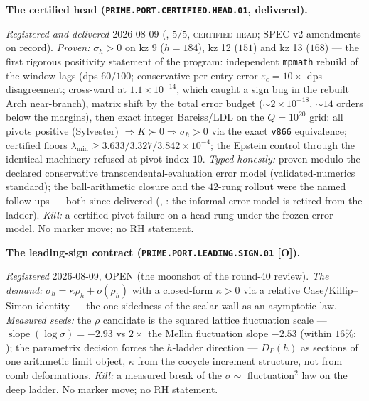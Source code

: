 \par\smallskip\noindent\textbf{The certified head
(\texttt{PRIME.PORT.CERTIFIED.\allowbreak HEAD.01},
delivered).}
{\sloppy
\emph{Registered and delivered} 2026-08-09
(, $5/5$,
\textsc{certified-head}; SPEC v2 amendments on record).
\emph{Proven:} $\sigma_h > 0$ on kz 9 ($h = 184$), kz 12 ($151$)
and kz 13 ($168$) --- the first rigorous positivity statement of
the program: independent \texttt{mpmath} rebuild of the window
lags (dps $60/100$; conservative per-entry error $\varepsilon_c
= 10\times$ dps-disagreement; cross-ward at $1.1\times10^{-14}$,
which caught a sign bug in the rebuilt Arch near-branch), matrix
shift by the total error budget (${\sim}2\times10^{-18}$,
${\sim}14$ orders below the margins), then exact integer
Bareiss/LDL on the $Q = 10^{20}$ grid: all pivots positive
(Sylvester) $\Rightarrow K \succ 0 \Rightarrow \sigma_h > 0$ via
the exact \texttt{v866} equivalence; certified floors
$\lambda_{\min} \ge 3.633/3.327/3.842\times10^{-4}$; the Epstein
control through the identical machinery refused at pivot index
$10$.  \emph{Typed honestly:} proven modulo the declared
conservative transcendental-evaluation error model
(validated-numerics standard); the ball-arithmetic closure and
the $42$-rung rollout were the named follow-ups --- both since
delivered (,
: the informal error
model is retired from the ladder).  \emph{Kill:} a certified
pivot failure on a head rung under the frozen error
model.  No marker move; no RH statement.\par}


\par\smallskip\noindent\textbf{The leading-sign contract
(\texttt{PRIME.PORT.LEADING.\allowbreak SIGN.01} [O]).}
{\sloppy
\emph{Registered} 2026-08-09, OPEN (the moonshot of the
round-40 review).  \emph{The demand:} $\sigma_h = \kappa\rho_h +
o(\rho_h)$ with a closed-form $\kappa > 0$ via a relative
Case/Killip--Simon identity --- the one-sidedness of the scalar
wall as an asymptotic law.  \emph{Measured seeds:} the $\rho$
candidate is the squared lattice fluctuation scale ---
$\operatorname{slope}(\log\sigma) = -2.93$ vs $2\times$ the
Mellin fluctuation slope $-2.53$ (within $16\%$;
); the parametrix decision
forces the $h$-ladder direction --- $D_P(h)$ as sections of one
arithmetic limit object, $\kappa$ from the cocycle increment
structure, not from comb deformations.  \emph{Kill:} a measured
break of the $\sigma \sim$ fluctuation$^2$ law on the deep
ladder.  No marker move; no RH statement.\par}


